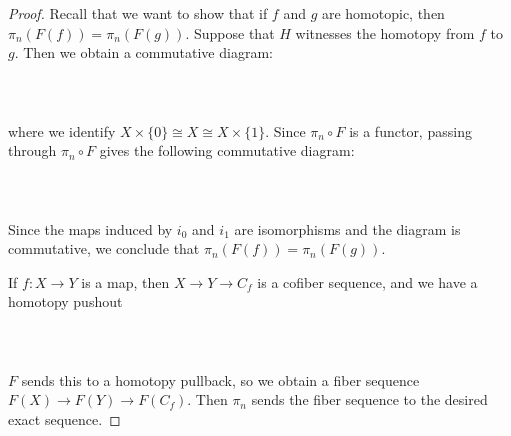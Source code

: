 \begin{thm}
\begin{proof}
Recall that we want to show that if $f$ and $g$ are homotopic, then $\pi_n(F(f))=\pi_n(F(g))$. Suppose that $H$ witnesses the homotopy from $f$ to $g$. Then we obtain a commutative diagram:  
 \\~\\  \\~\\
where we identify $X\times\{0\}\cong X\cong X\times\{1\}$. Since $\pi_n\circ F$ is a functor, passing through $\pi_n\circ F$ gives the following commutative diagram:  
 \\~\\  \\~\\
Since the maps induced by $i_0$ and $i_1$ are isomorphisms and the diagram is commutative, we conclude that $\pi_n(F(f))=\pi_n(F(g))$. 

If $f:X\to Y$ is a map, then $X\to Y\to C_f$ is a cofiber sequence, and we have a homotopy pushout  
 \\~\\  \\~\\
$F$ sends this to a homotopy pullback, so we obtain a fiber sequence $F(X)\to F(Y)\to F(C_f)$. Then $\pi_n$ sends the fiber sequence to the desired exact sequence. 


\end{proof}
\end{thm}
